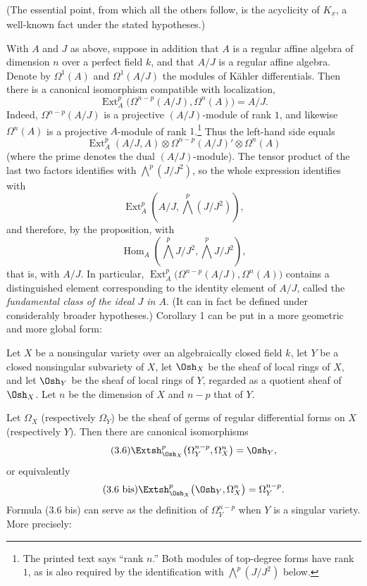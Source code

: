 (The essential point, from which all the others follow, is the acyclicity of
$K_{\underline{x}}$, a well-known fact under the stated hypotheses.)

 With $A$ and $J$ as above, suppose in addition that $A$
is a regular affine algebra of dimension $n$ over a perfect field $k$, and that
$A/J$ is a regular affine algebra. Denote by $\Omega^{1}(A)$ and
$\Omega^{1}(A/J)$ the modules of Kähler differentials. Then there is a canonical
isomorphism compatible with localization,
\begin{equation}\tag{3.5}
  \operatorname{Ext}_{A}^{p}\bigl(\Omega^{n-p}(A/J),\Omega^{n}(A)\bigr)=A/J.
\end{equation}
Indeed, $\Omega^{n-p}(A/J)$ is a projective $(A/J)$-module of rank $1$, and likewise
$\Omega^{n}(A)$ is a projective $A$-module of rank $1$.\footnote{The printed text says
“rank $n$.” Both modules of top-degree forms have rank $1$, as is also required
by the identification with $\bigwedge^{p}(J/J^{2})$ below.} Thus the left-hand
side equals
\[
  \operatorname{Ext}_{A}^{p}(A/J,A)
  \otimes\Omega^{n-p}(A/J)'\otimes\Omega^{n}(A)
\]
(where the prime denotes the dual $(A/J)$-module). The tensor product of the
last two factors identifies with $\bigwedge^{p}(J/J^{2})$, so the whole expression
identifies with
\[
  \operatorname{Ext}_{A}^{p}\!\left(A/J,\bigwedge^{p}(J/J^{2})\right),
\]
and therefore, by the proposition, with
\[
  \operatorname{Hom}_{A}\!\left(\bigwedge^{p}J/J^{2},
  \bigwedge^{p}J/J^{2}\right),
\]
that is, with $A/J$. In particular,
$\operatorname{Ext}_{A}^{p}\bigl(\Omega^{n-p}(A/J),\Omega^{n}(A)\bigr)$ contains
a distinguished element corresponding to the identity element of $A/J$, called
the \emph{fundamental class of the ideal $J$ in $A$}. (It can in fact be defined
under considerably broader hypotheses.) Corollary 1 can be put in a more
geometric and more global form:

 Let $X$ be a nonsingular variety over an algebraically
closed field $k$, let $Y$ be a closed nonsingular subvariety of $X$, let
$\Osh_X$ be the sheaf of local rings of $X$, and let $\Osh_Y$ be the sheaf of
local rings of $Y$, regarded as a quotient sheaf of $\Osh_X$. Let $n$ be the
dimension of $X$ and $n-p$ that of $Y$.

Let $\Omega_X$ (respectively $\Omega_Y$) be the sheaf of germs of regular
differential forms on $X$ (respectively $Y$). Then there are canonical
isomorphisms
\begin{equation}\tag{3.6}
  \Extsh_{\Osh_X}^{p}\bigl(\Omega_Y^{n-p},\Omega_X^{n}\bigr)=\Osh_Y,
\end{equation}
or equivalently
\begin{equation}\tag{3.6 bis}
  \Extsh_{\Osh_X}^{p}\bigl(\Osh_Y,\Omega_X^{n}\bigr)=\Omega_Y^{n-p}.
\end{equation}
Formula (3.6 bis) can serve as the definition of $\Omega_Y^{n-p}$ when $Y$ is a
singular variety. More precisely:


